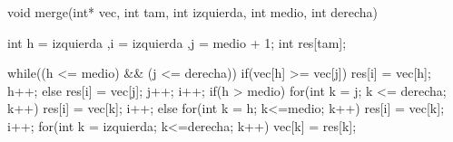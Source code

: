 void merge(int* vec, int tam, int izquierda, int medio, int derecha){
    int h = izquierda ,i = izquierda ,j = medio + 1;
    int res[tam];
    
    while((h <= medio) \&\& (j <= derecha)){
        if(vec[h] >= vec[j]){
            res[i] = vec[h];
            h++;
        }
        else{
            res[i] = vec[j];
            j++;
        }
        i++;
    }
    if(h > medio){
        for(int k = j; k <= derecha; k++){
            res[i] = vec[k];
            i++;
        }
    }
    else{
        for(int k = h; k<=medio; k++){
            res[i] = vec[k];
            i++;
        }
    }
    for(int k = izquierda; k<=derecha; k++){
        vec[k] = res[k];
    }
}
